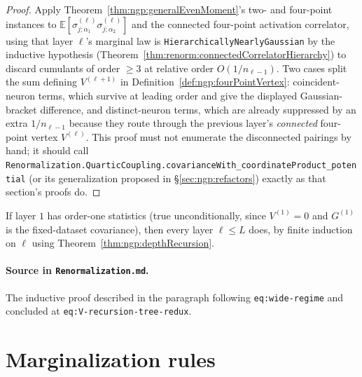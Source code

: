 \begin{proof}
Apply Theorem~\ref{thm:ngp:generalEvenMoment}'s two- and four-point instances to
$\mathbb E[\sigma^{(\ell)}_{j;\alpha_1}\sigma^{(\ell)}_{j;\alpha_2}]$ and the connected four-point
activation correlator, using that layer $\ell$'s marginal law is
\texttt{HierarchicallyNearlyGaussian} by the inductive hypothesis
(Theorem~\ref{thm:renorm:connectedCorrelatorHierarchy}) to discard cumulants of order $\geq3$ at
relative order $O(1/n_{\ell-1})$. Two cases split the sum defining $V^{(\ell+1)}$ in
Definition~\ref{def:ngp:fourPointVertex}: coincident-neuron terms, which survive at leading order
and give the displayed Gaussian-bracket difference, and distinct-neuron terms, which are already
suppressed by an extra $1/n_{\ell-1}$ because they route through the previous layer's
\emph{connected} four-point vertex $V^{(\ell)}$. This proof must not enumerate the disconnected
pairings by hand; it should call
\texttt{Renormalization.QuarticCoupling.covarianceWith\_coordinateProduct\_potential} (or its
generalization proposed in \S\ref{sec:ngp:refactors}) exactly as
that section's proofs do.
\end{proof}

\begin{corollary}
\label{cor:ngp:everyLayerOrderOne}
If layer $1$ has order-one statistics (true unconditionally, since $V^{(1)}=0$ and $G^{(1)}$ is the
fixed-dataset covariance), then every layer $\ell\leq L$ does, by finite induction on $\ell$ using
Theorem~\ref{thm:ngp:depthRecursion}.

\paragraph{Source in \texttt{Renormalization.md}.}
The inductive proof described in the paragraph following \texttt{eq:wide-regime} and concluded at
\texttt{eq:V-recursion-tree-redux}.
\end{corollary}

\section{Marginalization rules}
\label{sec:ngp:marginalization}


